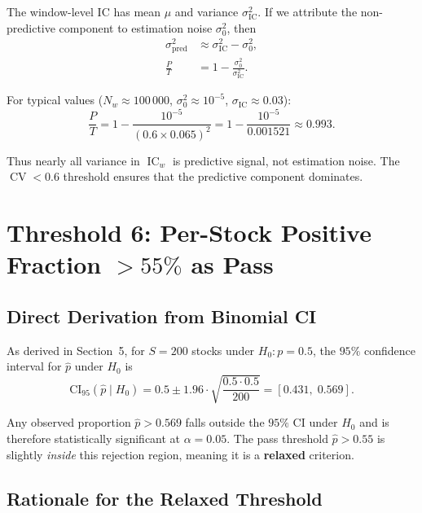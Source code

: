 \documentclass[11pt,a4paper]{article}
\theoremstyle{definition}
\newcommand{\IC}{\operatorname{IC}}
\newcommand{\CV}{\operatorname{CV}}
\newcommand{\Ho}{H_{0}}
\begin{document}
The window-level IC has mean $\mu$ and variance $\sigma_{\IC}^2$.  If we
attribute the non-predictive component to estimation noise $\sigma_0^2$,
then
\begin{align}
    \sigma_{\text{pred}}^2 &\approx \sigma_{\IC}^2 - \sigma_0^2, \\
    \frac{P}{T} &= 1 - \frac{\sigma_0^2}{\sigma_{\IC}^2}.
\end{align}

For typical values ($N_w \approx 100\,000$, $\sigma_0^2 \approx 10^{-5}$,
$\sigma_{\IC} \approx 0.03$):
\begin{equation}
    \frac{P}{T} = 1 - \frac{10^{-5}}{(0.6 \times 0.065)^2}
                = 1 - \frac{10^{-5}}{0.001521}
                \approx 0.993.
\end{equation}

Thus nearly all variance in $\IC_w$ is predictive signal, not estimation
noise.  The $\CV < 0.6$ threshold ensures that the predictive component
dominates.

\section{Threshold 6: Per-Stock Positive Fraction \texorpdfstring{$> 55\%$}{> 55\%} as Pass}

\subsection{Direct Derivation from Binomial CI}

As derived in Section~5, for $S = 200$ stocks under $\Ho: p = 0.5$, the
$95\%$ confidence interval for $\hat{p}$ under $\Ho$ is
\begin{equation}
    \text{CI}_{95}(\hat{p} \mid \Ho) = 0.5 \pm 1.96 \cdot \sqrt{\frac{0.5 \cdot 0.5}{200}}
                                     = [0.431,\;0.569].
    \label{eq:ho_ci}
\end{equation}

Any observed proportion $\hat{p} > 0.569$ falls outside the $95\%$ CI under
$\Ho$ and is therefore statistically significant at $\alpha = 0.05$.
The pass threshold $\hat{p} > 0.55$ is slightly \emph{inside} this rejection
region, meaning it is a \textbf{relaxed} criterion.

\subsection{Rationale for the Relaxed Threshold}
\end{document}

